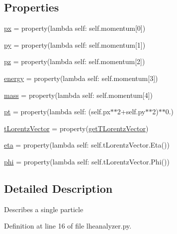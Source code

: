 \subsection*{Properties}
\begin{DoxyCompactItemize}
\item 
\hyperlink{classlheanalyzer_1_1Particle_a4206becef189fb59b6ef8821a2cd9ad9}{px} = property(lambda self\-: self.\-momentum\mbox{[}0\mbox{]})
\item 
\hyperlink{classlheanalyzer_1_1Particle_aaebf738e9976bd94c91a0983e7c9c11e}{py} = property(lambda self\-: self.\-momentum\mbox{[}1\mbox{]})
\item 
\hyperlink{classlheanalyzer_1_1Particle_a4f8bf461663f7f0e9cf264fdd0f40cbe}{pz} = property(lambda self\-: self.\-momentum\mbox{[}2\mbox{]})
\item 
\hyperlink{classlheanalyzer_1_1Particle_a6dff44bd61eee7c801d20fc897ba3234}{energy} = property(lambda self\-: self.\-momentum\mbox{[}3\mbox{]})
\item 
\hyperlink{classlheanalyzer_1_1Particle_a8036328b841efce9867c607010b77208}{mass} = property(lambda self\-: self.\-momentum\mbox{[}4\mbox{]})
\item 
\hyperlink{classlheanalyzer_1_1Particle_adbd412eff8a9c56b420e90cbefb080e2}{pt} = property(lambda self\-: (self.\-px$\ast$$\ast$2+self.\-py$\ast$$\ast$2)$\ast$$\ast$0.)
\item 
\hyperlink{classlheanalyzer_1_1Particle_ac32abe22b6ec78e2158c36bcd4097ca5}{t\-Lorentz\-Vector} = property(\hyperlink{classlheanalyzer_1_1Particle_a3b23a94b72794bb7ebcb82e037c90e99}{get\-T\-Lorentz\-Vector})
\item 
\hyperlink{classlheanalyzer_1_1Particle_a3b25b63ffcd271b0aaf3fc2f42a366b4}{eta} = property(lambda self\-: self.\-t\-Lorentz\-Vector.\-Eta())
\item 
\hyperlink{classlheanalyzer_1_1Particle_ae732c25b7618992ffbdc2dbc3621f425}{phi} = property(lambda self\-: self.\-t\-Lorentz\-Vector.\-Phi())
\end{DoxyCompactItemize}


\subsection{Detailed Description}
\begin{DoxyVerb}Describes a single particle\end{DoxyVerb}
 

Definition at line 16 of file lheanalyzer.\-py.



